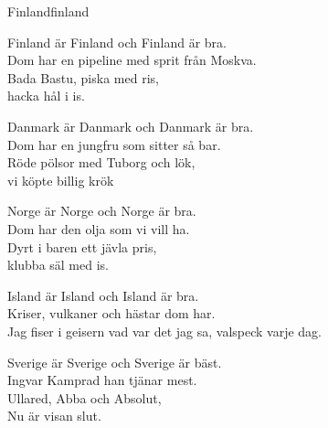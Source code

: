 \begin{song}{Finland}{finland}
\begin{vers}
Finland är Finland och Finland är bra.\\
Dom har en pipeline med sprit från Moskva.\\
Bada Bastu, piska med ris,\\
hacka hål i is.\\
\end{vers}
\begin{vers}
Danmark är Danmark och Danmark är bra.\\
Dom har en jungfru som sitter så bar.\\
Röde pölsor med Tuborg och lök,\\
vi köpte billig krök\\
\end{vers}
\begin{vers}
Norge är Norge och Norge är bra.\\
Dom har den olja som vi vill ha.\\
Dyrt i baren ett jävla pris,\\
klubba säl med is.\\
\end{vers}
\begin{vers}
Island är Island och Island är bra.\\
Kriser, vulkaner och hästar dom har.\\
Jag fiser i geisern vad var det jag sa, valspeck varje dag.\\
\end{vers}
\begin{vers}
Sverige är Sverige och Sverige är bäst.\\
Ingvar Kamprad han tjänar mest.\\
Ullared, Abba och Absolut,\\
Nu är visan slut.\\
\end{vers}
\end{song}
